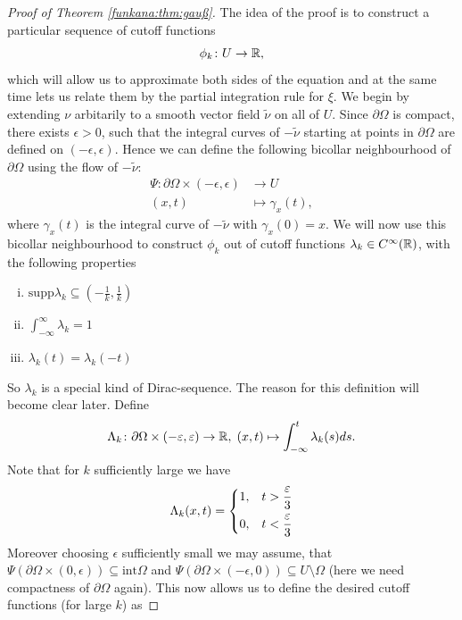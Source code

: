\begin{proof}[Proof of Theorem \ref{funkana:thm:gauß}]
    The idea of the proof is to construct a particular sequence of cutoff functions 
    \[
    \phi_k \colon U \to \R,
    \]
    which will allow us to approximate both sides of the equation and at the same time lets us relate them by the partial integration rule for $\xi$. We begin by extending $\nu$ arbitarily to a smooth vector field $\tilde{\nu}$ on all of $U$. Since $\partial \Omega$ is compact, there exists $\epsilon > 0$, such that the integral curves of $-\tilde{\nu}$ starting at points in $\partial \Omega$ are defined on $(-\epsilon,\epsilon)$. Hence we can define the following bicollar neighbourhood of $\partial \Omega$ using the flow of $-\tilde{\nu}$:
    \begin{align*}
        \Psi \colon \partial \Omega \times (-\epsilon,\epsilon) &\to U \\
        (x,t) &\mapsto \gamma_x(t),
    \end{align*}
    where $\gamma_x(t)$ is the integral curve of $-\tilde{\nu}$ with $\gamma_x(0) = x$. We will now use this bicollar neighbourhood to construct $\phi_k$ out of cutoff functions $\lambda_k \in C^\infty(\R)$, with the following properties 
    \begin{enumerate}[(i)]
        \item $\mathrm{supp}\lambda_k \subseteq (-\frac{1}{k},\frac{1}{k})$
        \item $\int_{-\infty}^\infty \lambda_k = 1$
        \item $\lambda_k(t) = \lambda_k(-t)$
    \end{enumerate}
    So $\lambda_k$ is a special kind of Dirac-sequence. The reason for this definition will become clear later. Define 
    \[
    \Lambda_k \colon \partial\Omega \times (-\epsilon,\epsilon) \to \R, \; (x,t) \mapsto \int_{-\infty}^{t} \lambda_k(s) ds.
    \]
    Note that for $k$ sufficiently large we have 
    \[
    \Lambda_k(x,t) = \begin{dcases}
        1, & t > \frac{\epsilon}{3} \\
        0, & t < \frac{\epsilon}{3}
    \end{dcases}
    \]
    Moreover choosing $\epsilon$ sufficiently small we may assume, that $\Psi(\partial \Omega \times (0,\epsilon)) \subseteq \mathrm{int} \Omega$ and $\Psi(\partial \Omega \times (-\epsilon,0)) \subseteq U\setminus\Omega$ (here we need compactness of $\partial \Omega$ again). This now allows us to define the desired cutoff functions (for large $k$) as 

\end{proof}
